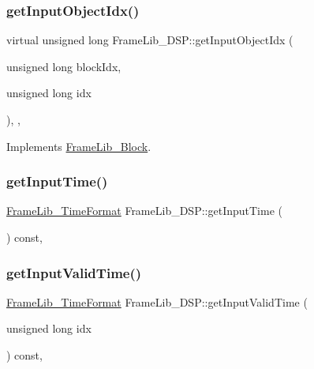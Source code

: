 \subsubsection{\texorpdfstring{get\+Input\+Object\+Idx()}{getInputObjectIdx()}}
{\footnotesize\ttfamily virtual unsigned long Frame\+Lib\+\_\+\+D\+S\+P\+::get\+Input\+Object\+Idx (\begin{DoxyParamCaption}\item[{unsigned long}]{block\+Idx,  }\item[{unsigned long}]{idx }\end{DoxyParamCaption})\hspace{0.3cm}{\ttfamily [inline]}, {\ttfamily [protected]}, {\ttfamily [virtual]}}



Implements \hyperlink{class_frame_lib___block_a65748f72b840fd90bee87591446b9b50}{Frame\+Lib\+\_\+\+Block}.

\mbox{\label{class_frame_lib___d_s_p_afd7cae225f75c8cd4bd773bf188961b2}} 
\subsubsection{\texorpdfstring{get\+Input\+Time()}{getInputTime()}}
{\footnotesize\ttfamily \hyperlink{_frame_lib___types_8h_a699a4071a9eaaa283906a5ebd0a79ac0}{Frame\+Lib\+\_\+\+Time\+Format} Frame\+Lib\+\_\+\+D\+S\+P\+::get\+Input\+Time (\begin{DoxyParamCaption}{ }\end{DoxyParamCaption}) const\hspace{0.3cm}{\ttfamily [inline]}, {\ttfamily [protected]}}

\mbox{\label{class_frame_lib___d_s_p_a699dda68553ddebd5ca8c70326fb40a5}} 
\subsubsection{\texorpdfstring{get\+Input\+Valid\+Time()}{getInputValidTime()}}
{\footnotesize\ttfamily \hyperlink{_frame_lib___types_8h_a699a4071a9eaaa283906a5ebd0a79ac0}{Frame\+Lib\+\_\+\+Time\+Format} Frame\+Lib\+\_\+\+D\+S\+P\+::get\+Input\+Valid\+Time (\begin{DoxyParamCaption}\item[{unsigned long}]{idx }\end{DoxyParamCaption}) const\hspace{0.3cm}{\ttfamily [inline]}, {\ttfamily [protected]}}

